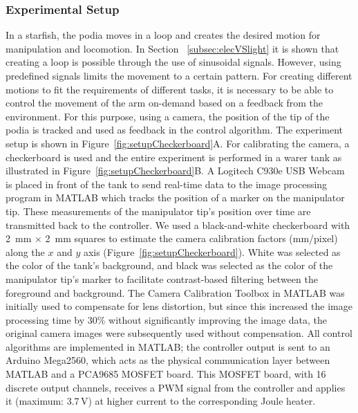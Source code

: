 \subsubsection{Experimental Setup}
In a starfish, the podia moves in a loop and creates the desired motion for manipulation and locomotion. In Section ~\ref{subsec:elecVSlight} it is shown that creating a loop is possible through the use of sinusoidal signals. However, using predefined signals limits the movement to a certain pattern. For creating different motions to fit the requirements of different tasks, it is necessary to be able to control the movement of the arm on-demand based on a feedback from the environment. For this purpose, using a camera, the position of the tip of the podia is tracked and used as feedback in the control algorithm. The experiment setup is shown in Figure~\ref{fig:setupCheckerboard}A. For calibrating the camera, a checkerboard is used and the entire experiment is performed in a warer tank as illustrated in Figure~\ref{fig:setupCheckerboard}B. A Logitech C930e USB Webcam is placed in front of the tank to send real-time data to the image processing program in MATLAB which tracks the position of a marker on the manipulator tip. These measurements of the manipulator tip's position over time are transmitted back to the controller. We used a black-and-white checkerboard with 2~mm $\times$ 2~mm squares to estimate the camera calibration factors (mm/pixel) along the $x$ and $y$ axis (Figure~\ref{fig:setupCheckerboard}). White was selected as the color of the tank's background, and black was selected as the color of the manipulator tip's marker to facilitate contrast-based filtering between the foreground and background. The Camera Calibration Toolbox in MATLAB was initially used to compensate for lens distortion, but since this increased the image processing time by 30\% without significantly improving the image data, the original camera images were subsequently used without compensation. All control algorithms are implemented in MATLAB; the controller output is sent to an Arduino Mega2560, which acts as the physical communication layer between MATLAB and a  PCA9685 MOSFET board. This MOSFET board, with 16 discrete output channels, receives a PWM signal from the controller and applies it (maximum: 3.7\,V) at higher current to the corresponding Joule heater.


